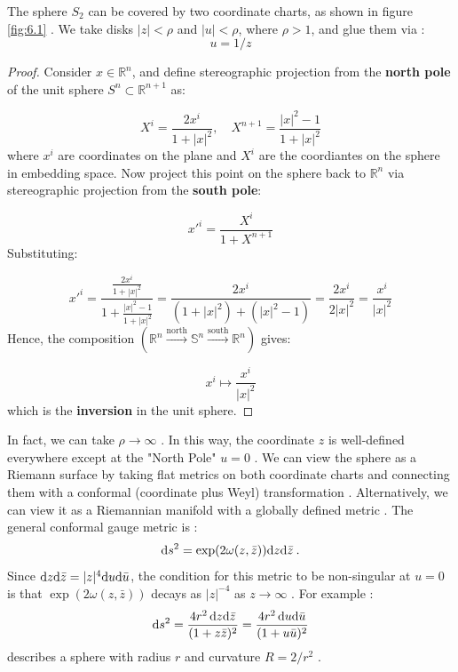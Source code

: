 The sphere $S_2$ can be covered by two coordinate charts, as shown in figure \ref{fig:6.1} . We take disks $|z|<\rho$ and $|u|<\rho$, where $\rho>1$, and glue them via :
\begin{equation}
	u=1 / z  \label{6.1.1}
\end{equation}
\begin{tcolorbox}[breakable]
	\begin{proof}
		Consider \( x \in \mathbb{R}^n \), and define stereographic projection from the \textbf{north pole} of the unit sphere \( S^n \subset \mathbb{R}^{n+1} \) as:
		
		\[
		X^i = \frac{2x^i}{1 + |x|^2}, \quad
		X^{n+1} = \frac{|x|^2 - 1}{1 + |x|^2}
		\]
		where $x^i$ are coordinates on the plane and $X^i$ are the coordiantes on the sphere in embedding space. Now project this point on the sphere back to \( \mathbb{R}^n \) via stereographic projection from the \textbf{south pole}:
		
		\[
		x'^i = \frac{X^i}{1 + X^{n+1}}
		\]
		Substituting:
		
		\[
		x'^i = \frac{\frac{2x^i}{1 + |x|^2}}{1 + \frac{|x|^2 - 1}{1 + |x|^2}}
		= \frac{2x^i}{(1 + |x|^2) + (|x|^2 - 1)} = \frac{2x^i}{2|x|^2} = \frac{x^i}{|x|^2}
		\]
		Hence, the composition $(\mathbb{R}^n \xrightarrow{\text{north}} \mathbb{S}^n \xrightarrow{\text{south}} \mathbb{R}^n)$ gives:
		
		\[
		x^i \mapsto \frac{x^i}{|x|^2}
		\]
		which is the \textbf{inversion} in the unit sphere.
	\end{proof}
\end{tcolorbox}
In fact, we can take $\rho \to \infty$ . In this way, the coordinate $z$ is well-defined everywhere except at the "North Pole" $u=0$ . We can view the sphere as a Riemann surface by taking flat metrics on both coordinate charts and connecting them with a conformal (coordinate plus Weyl) transformation . Alternatively, we can view it as a Riemannian manifold with a globally defined metric . The general conformal gauge metric is :
\begin{equation}
	\mathrm{d} s^{2}=\exp (2 \omega(z, \bar{z})) \mathrm{d} z \mathrm{d} \bar{z} \:. \label{6.1.2}
\end{equation}
Since $\mathrm{d} z \mathrm{d} \bar{z}=|z|^{4} \mathrm{d} u \mathrm{d} \bar{u}$, the condition for this metric to be non-singular at $u=0$ is that $\exp (2 \omega(z, \bar{z}))$ decays as $|z|^{-4}$ as $z \to \infty$ . For example :
\begin{equation}
	\mathrm{d} s^{2}=\frac{4 r^{2}\, \mathrm{d} z \mathrm{d} \bar{z}}{(1+z \bar{z})^{2}}=\frac{4 r^{2}\, \mathrm{d} u \mathrm{d} \bar{u}}{(1+u \bar{u})^{2}} \label{6.1.3}
\end{equation}
describes a sphere with radius $r$ and curvature $R=2 / r^{2}$ .

